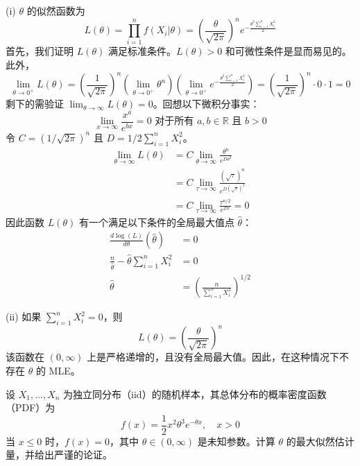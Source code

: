 \begin{questions}
\begin{solution}
(i) $\theta$ 的似然函数为
\[
L(\theta) = \prod_{i=1}^n f(X_i|\theta) = \left(\frac{\theta}{\sqrt{2\pi}}\right)^n e^{-\frac{\theta^2 \sum_{i=1}^n X_i^2}{2}}
\]
首先，我们证明 $L(\theta)$ 满足标准条件。$L(\theta) > 0$ 和可微性条件是显而易见的。此外，
\[
\lim_{\theta \to 0^+} L(\theta) = \left(\frac{1}{\sqrt{2\pi}}\right)^n \left(\lim_{\theta \to 0^+} \theta^n\right) \left(\lim_{\theta \to 0^+} e^{-\frac{\theta^2 \sum_{i=1}^n X_i^2}{2}}\right) = \left(\frac{1}{\sqrt{2\pi}}\right)^n \cdot 0 \cdot 1 = 0
\]
剩下的需验证 $\lim_{\theta \to \infty} L(\theta) = 0$。回想以下微积分事实：
\[
\lim_{x \to \infty} \frac{x^a}{e^{bx}} = 0 \text{ 对于所有 } a, b \in \mathbb{R} \text{ 且 } b > 0
\]
令 $C = (1/\sqrt{2\pi})^n$ 且 $D = 1/2 \sum_{i=1}^n X_i^2$。
\begin{align*}
\lim_{\theta \to \infty} L(\theta) &= C \lim_{\theta \to \infty} \frac{\theta^n}{e^{D\theta^2}} \\
&= C \lim_{\tau \to \infty} \frac{(\sqrt{\tau})^n}{e^{D(\sqrt{\tau})^2}} \\
&= C \lim_{\tau \to \infty} \frac{\tau^{n/2}}{e^{D\tau}} = 0
\end{align*}
因此函数 $L(\theta)$ 有一个满足以下条件的全局最大值点 $\hat{\theta}$：
\begin{align*}
\frac{d \log(L)}{d\theta}(\hat{\theta}) &= 0 \\
\frac{n}{\hat{\theta}} - \hat{\theta} \sum_{i=1}^n X_i^2 &= 0 \\
\hat{\theta} &= \left(\frac{n}{\sum_{i=1}^n X_i^2}\right)^{1/2}
\end{align*}

(ii) 如果 $\sum_{i=1}^n X_i^2 = 0$，则
\[
L(\theta) = \left(\frac{\theta}{\sqrt{2\pi}}\right)^n
\]
该函数在 $(0, \infty)$ 上是严格递增的，且没有全局最大值。因此，在这种情况下不存在 $\theta$ 的 MLE。
\end{solution}

\question
设 $X_1, \dots, X_n$ 为独立同分布（iid）的随机样本，其总体分布的概率密度函数（PDF）为
\[
f(x) = \frac{1}{2}x^2\theta^3e^{-\theta x}, \quad x > 0
\]
当 $x \le 0$ 时，$f(x) = 0$，其中 $\theta \in (0, \infty)$ 是未知参数。计算 $\theta$ 的最大似然估计量，并给出严谨的论证。


\end{questions}
